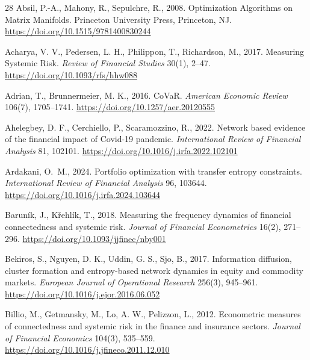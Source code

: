 \documentclass[12pt]{article}
\begin{document}
\begin{thebibliography}{28}
Absil, P.-A., Mahony, R., Sepulchre, R., 2008.
\newblock Optimization Algorithms on Matrix Manifolds.
\newblock Princeton University Press, Princeton, NJ. \url{https://doi.org/10.1515/9781400830244}

Acharya, V. V., Pedersen, L. H., Philippon, T., Richardson, M., 2017.
\newblock Measuring Systemic Risk.
\newblock \emph{Review of Financial Studies} 30(1), 2--47. \url{https://doi.org/10.1093/rfs/hhw088}

Adrian, T., Brunnermeier, M. K., 2016.
\newblock CoVaR.
\newblock \emph{American Economic Review} 106(7), 1705--1741. \url{https://doi.org/10.1257/aer.20120555}

Ahelegbey, D. F., Cerchiello, P., Scaramozzino, R., 2022.
\newblock Network based evidence of the financial impact of Covid-19 pandemic.
\newblock \emph{International Review of Financial Analysis} 81, 102101. \url{https://doi.org/10.1016/j.irfa.2022.102101}

Ardakani, O.~M., 2024.
\newblock Portfolio optimization with transfer entropy constraints.
\newblock \emph{International Review of Financial Analysis} 96, 103644. \url{https://doi.org/10.1016/j.irfa.2024.103644}

Barun{\'i}k, J., K{\v{r}}ehl{\'i}k, T., 2018.
\newblock Measuring the frequency dynamics of financial connectedness and systemic risk.
\newblock \emph{Journal of Financial Econometrics} 16(2), 271--296. \url{https://doi.org/10.1093/jjfinec/nby001}

Bekiros, S., Nguyen, D. K., Uddin, G. S., Sjo, B., 2017.
\newblock Information diffusion, cluster formation and entropy-based network dynamics in equity and commodity markets.
\newblock \emph{European Journal of Operational Research} 256(3), 945--961. \url{https://doi.org/10.1016/j.ejor.2016.06.052}

Billio, M., Getmansky, M., Lo, A. W., Pelizzon, L., 2012.
\newblock Econometric measures of connectedness and systemic risk in the finance and insurance sectors.
\newblock \emph{Journal of Financial Economics} 104(3), 535--559. \url{https://doi.org/10.1016/j.jfineco.2011.12.010}


\end{thebibliography}
\end{document}
